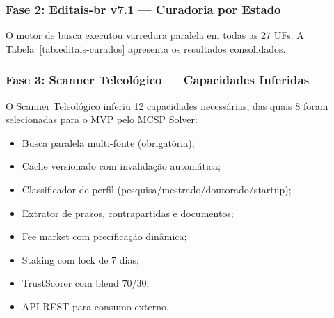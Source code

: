 \subsubsection{Fase 2: Editais-br v7.1 --- Curadoria por Estado}

O motor de busca executou varredura paralela em todas as 27 UFs. A
Tabela~\ref{tab:editais-curados} apresenta os resultados consolidados.

\begin{table}[htb]
\centering
\caption{Editais curados por estado (top 10 por volume)}
\label{tab:editais-curados}
\small
\end{table}

\subsubsection{Fase 3: Scanner Teleológico --- Capacidades Inferidas}

O Scanner Teleológico inferiu 12 capacidades necessárias, das quais
8 foram selecionadas para o MVP pelo MCSP Solver:

\begin{itemize}
    \item Busca paralela multi-fonte (obrigatória);
    \item Cache versionado com invalidação automática;
    \item Classificador de perfil (pesquisa/mestrado/doutorado/startup);
    \item Extrator de prazos, contrapartidas e documentos;
    \item Fee market com precificação dinâmica;
    \item Staking com lock de 7 dias;
    \item TrustScorer com blend 70/30;
    \item API REST para consumo externo.
\end{itemize}


